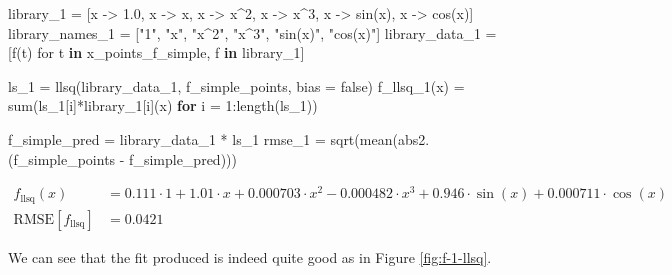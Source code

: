 \documentclass[
]{article}
\newenvironment{Shaded}{\begin{snugshade}}{\end{snugshade}}
\newcommand{\ConstantTok}[1]{\textcolor[rgb]{0.56,0.35,0.01}{#1}}
\newcommand{\ControlFlowTok}[1]{\textcolor[rgb]{0.00,0.23,0.31}{\textbf{#1}}}
\newcommand{\FloatTok}[1]{\textcolor[rgb]{0.68,0.00,0.00}{#1}}
\newcommand{\FunctionTok}[1]{\textcolor[rgb]{0.28,0.35,0.67}{#1}}
\newcommand{\KeywordTok}[1]{\textcolor[rgb]{0.00,0.23,0.31}{\textbf{#1}}}
\newcommand{\NormalTok}[1]{\textcolor[rgb]{0.00,0.23,0.31}{#1}}
\newcommand{\OperatorTok}[1]{\textcolor[rgb]{0.37,0.37,0.37}{#1}}
\newcommand{\StringTok}[1]{\textcolor[rgb]{0.13,0.47,0.30}{#1}}
\begin{document}
\begin{Shaded}
\begin{Highlighting}[]
\NormalTok{library\_1 }\OperatorTok{=}\NormalTok{ [x }\OperatorTok{{-}\textgreater{}} \FloatTok{1.0}\NormalTok{, x }\OperatorTok{{-}\textgreater{}}\NormalTok{ x, x }\OperatorTok{{-}\textgreater{}}\NormalTok{ x}\OperatorTok{\^{}}\FloatTok{2}\NormalTok{, x }\OperatorTok{{-}\textgreater{}}\NormalTok{ x}\OperatorTok{\^{}}\FloatTok{3}\NormalTok{, x }\OperatorTok{{-}\textgreater{}} \FunctionTok{sin}\NormalTok{(x), x }\OperatorTok{{-}\textgreater{}} \FunctionTok{cos}\NormalTok{(x)]}
\NormalTok{library\_names\_1 }\OperatorTok{=}\NormalTok{ [}\StringTok{"1"}\NormalTok{, }\StringTok{"x"}\NormalTok{, }\StringTok{"x\^{}2"}\NormalTok{, }\StringTok{"x\^{}3"}\NormalTok{, }\StringTok{"sin(x)"}\NormalTok{, }\StringTok{"cos(x)"}\NormalTok{]}
\NormalTok{library\_data\_1 }\OperatorTok{=}\NormalTok{ [}\FunctionTok{f}\NormalTok{(t) for t }\KeywordTok{in}\NormalTok{ x\_points\_f\_simple, f }\KeywordTok{in}\NormalTok{ library\_1]}

\NormalTok{ls\_1 }\OperatorTok{=} \FunctionTok{llsq}\NormalTok{(library\_data\_1, f\_simple\_points, bias }\OperatorTok{=} \ConstantTok{false}\NormalTok{)}
\FunctionTok{f\_llsq\_1}\NormalTok{(x) }\OperatorTok{=} \FunctionTok{sum}\NormalTok{(ls\_1[i]}\OperatorTok{*}\NormalTok{library\_1[i](x) }\ControlFlowTok{for}\NormalTok{ i }\OperatorTok{=} \FloatTok{1}\OperatorTok{:}\FunctionTok{length}\NormalTok{(ls\_1))}

\NormalTok{f\_simple\_pred }\OperatorTok{=}\NormalTok{ library\_data\_1 }\OperatorTok{*}\NormalTok{ ls\_1}
\NormalTok{rmse\_1 }\OperatorTok{=} \FunctionTok{sqrt}\NormalTok{(}\FunctionTok{mean}\NormalTok{(}\FunctionTok{abs2}\NormalTok{.(f\_simple\_points }\OperatorTok{{-}}\NormalTok{ f\_simple\_pred)))}
\end{Highlighting}
\end{Shaded}

\begin{subequations} \label{eq:f-1-llsq} \begin{align}    f_{\text{llsq}}(x) &= 0.111 \cdot 1 + 1.01 \cdot x + 0.000703 \cdot x^{2} -0.000482 \cdot x^{3} + 0.946 \cdot \sin\left( x \right) + 0.000711 \cdot \cos\left( x \right) \\
  \text{RMSE}[f_{\text{llsq}}] &= 0.0421 \end{align} \end{subequations}

We can see that the fit produced is indeed quite good as in Figure
\ref{fig:f-1-llsq}.
\end{document}
